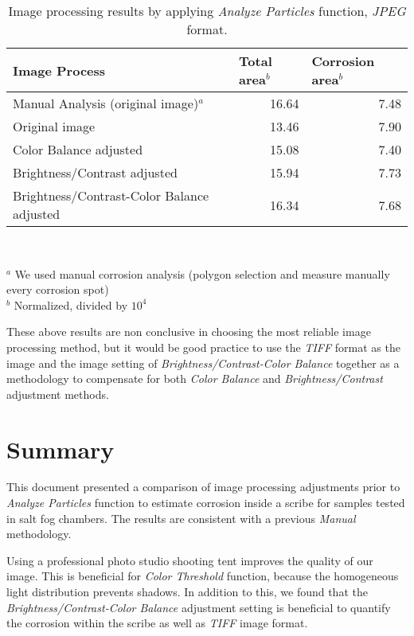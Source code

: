 \documentclass[10pt, fleqn]{article}    %
\begin{document}
\begin{table}[H]
	\centering
	\small
	\caption{Image processing results by applying \textit{Analyze Particles} function, \textit{JPEG} format.}
\begin{tabular}{|l|r|r|}
		\hline
		Image Process & \multicolumn{1}{l|}{Total area$^b$} & \multicolumn{1}{l|}{Corrosion area$^b$} \\ \hline
		Manual Analysis (original image)$^a$ & 16.64 & 7.48 \\ \hline
		Original image & 13.46 & 7.90 \\ \hline
		Color Balance adjusted  & 15.08 & 7.40 \\ \hline
		Brightness/Contrast adjusted & 15.94 & 7.73 \\ \hline
		Brightness/Contrast-Color Balance adjusted & 16.34 & 7.68 \\ \hline
	\end{tabular} \\
	\begin{flushleft}
		\footnotesize{$^a$ We used manual corrosion analysis (polygon selection and measure manually every corrosion spot)}\\
	\footnotesize{$^b$ Normalized, divided by $10^4$}
	\end{flushleft}

	\label{tab:ImageProcessingJPeg}
\end{table}







These above results are non conclusive in choosing the most reliable image processing method, but it would be good practice to use the \textit{TIFF} format as the image and the image setting of \textit{Brightness/Contrast-Color Balance} together as a methodology to compensate for both \textit{Color Balance } and \textit{Brightness/Contrast} adjustment methods.



\section*{Summary}
	
	
	This document presented a comparison of image processing adjustments prior to \textit{Analyze Particles} function to estimate corrosion inside a scribe for samples tested in salt fog chambers. The results are consistent with a previous \textit{Manual} methodology. 
	
	Using a professional photo studio shooting tent improves the quality of our image. This is beneficial for \textit{Color Threshold} function, because the homogeneous light distribution prevents shadows. In addition to this, we found that the \textit{Brightness/Contrast-Color Balance} adjustment setting is beneficial to quantify the corrosion within the scribe as well as \textit{TIFF} image format. 
	
	
	
	 
\end{document}
